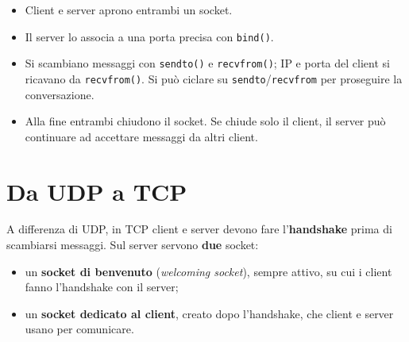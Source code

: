 \begin{itemize}
    \item Client e server aprono entrambi un socket.
    \item Il server lo associa a una porta precisa con \texttt{bind()}.
    \item Si scambiano messaggi con \texttt{sendto()} e \texttt{recvfrom()}; IP e porta del client si ricavano
          da \texttt{recvfrom()}. Si può ciclare su \texttt{sendto}/\texttt{recvfrom} per proseguire la conversazione.
    \item Alla fine entrambi chiudono il socket. Se chiude solo il client, il server può continuare ad accettare
          messaggi da altri client.
\end{itemize}

\section{Da UDP a TCP}

A differenza di UDP, in TCP client e server devono fare l'\textbf{handshake} prima di scambiarsi messaggi.
Sul server servono \textbf{due} socket:

\begin{itemize}
    \item un \textbf{socket di benvenuto} (\emph{welcoming socket}), sempre attivo, su cui i client fanno
          l'handshake con il server;
    \item un \textbf{socket dedicato al client}, creato dopo l'handshake, che client e server usano per comunicare.
\end{itemize}

